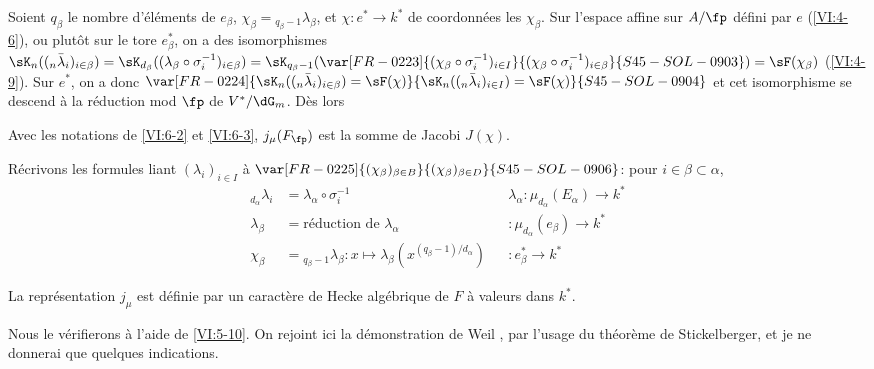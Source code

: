 Soient $q_\beta$ le nombre d'éléments de $e_\beta$, 
$\chi_\beta={}_{q_\beta-1}\lambda_\beta$, et 
$\chi:e^\ast \to k^\ast$ de coordonnées les $\chi_\beta$. Sur l'espace 
affine sur $A/\fp$ défini par $e$ (\ref{VI:4-6}), ou plutôt sur le tore 
$e_\beta^\ast$, on a des isomorphismes 
$\sK_n((_n\bar\lambda_i)_{i\in\beta}) = \sK_{d_\beta}((\lambda_\beta \circ \sigma_i^{-1})_{i\in\beta}) =\sK_{q_\beta-1}(\var[FR-0223]{(\chi_\beta\circ \sigma_i^{-1})_{i\in I}}{(\chi_\beta\circ \sigma_i^{-1})_{i\in\beta}}{S45-SOL-0903}) = \sF(\chi_\beta)$ (\ref{VI:4-9}). 
Sur $e^\ast$, on a donc $\var[FR-0224]{\sK_n((_n\bar\lambda_i)_{i\in \beta}) = \sF(\chi)}{\sK_n((_n\bar\lambda_i)_{i\in I}) = \sF(\chi)}{S45-SOL-0904}$ 
et cet isomorphisme se descend à la réduction mod $\fp$ de $V^\ast/\dG_m$. 
Dès lors





\begin{proposition_}\label{VI:6-4}
Avec les notations de \ref{VI:6-2} et \ref{VI:6-3}, $j_\mu(F_\fp)$ est la 
somme de Jacobi $J(\chi)$. 
\end{proposition_}

Récrivons les formules liant $(\lambda_i)_{i\in I}$ à 
$\var[FR-0225]{(\chi_\beta)_{\beta\in B}}{(\chi_\beta)_{\beta\in D}}{S45-SOL-0906}$: pour $i\in \beta\subset \alpha$, 
\begin{align*}
  _{d_\alpha} \lambda_i &= \lambda_\alpha\circ \sigma_i^{-1} && \lambda_\alpha:\mu_{d_\alpha}(E_\alpha) \to k^\ast \\
  \lambda_\beta &= \text{réduction de $\lambda_\alpha$} && :\mu_{d_\alpha}(e_\beta) \to k^\ast \\
  \chi_\beta &= {}_{q_\beta-1}\lambda_\beta: x\mapsto \lambda_\beta(x^{(q_\beta-1)/d_\alpha}) && :e_\beta^\ast \to k^\ast 
\end{align*}





\begin{theorem_}\label{VI:6-5}
La représentation $j_\mu$ est définie par un caractère de Hecke 
algébrique de $F$ à valeurs dans $k^\ast$. 
\end{theorem_}

Nous le vérifierons à l'aide de \ref{VI:5-10}. On rejoint ici la 
démonstration de Weil , par l'usage du théorème de 
Stickelberger, et je ne donnerai que quelques indications. 





